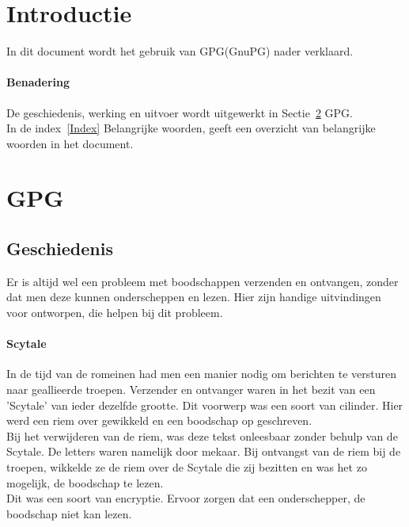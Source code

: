 \documentclass[12pt]{article}
\begin{document}
	\maketitle

	\newpage
	\tableofcontents
	\newpage
	\listoffigures
	\listoftables

	\newpage
		\section{Introductie}
			In dit document wordt het gebruik van GPG(GnuPG) nader verklaard.

		\paragraph{Benadering}
			De geschiedenis, werking en uitvoer wordt uitgewerkt in Sectie~\ref{GPG} GPG.\\
			In de index~\ref{Index} Belangrijke woorden, geeft een overzicht van 									belangrijke woorden in het document.

		\newpage
		\section{GPG}\label{GPG}
			\subsection{Geschiedenis}
				Er is altijd wel een probleem met boodschappen verzenden en ontvangen, zonder dat men 				deze kunnen onderscheppen en lezen. Hier zijn handige uitvindingen voor ontworpen, 						die helpen bij dit probleem.

			\paragraph{Scytale}
				In de tijd van de romeinen had men een manier nodig om berichten te versturen naar 						geallieerde troepen. Verzender en ontvanger waren in het bezit van een 									'Scytale' van ieder dezelfde grootte. Dit voorwerp was een soort van 					cilinder. Hier werd een riem over gewikkeld en een boodschap op geschreven.\\
				Bij het verwijderen van de riem, was deze tekst onleesbaar zonder behulp van de 						Scytale. De letters waren namelijk door mekaar. Bij ontvangst van de riem bij de 						troepen, wikkelde ze de riem over de Scytale die zij bezitten en was het zo mogelijk, 				de boodschap te lezen.\\
				Dit was een soort van encryptie. Ervoor zorgen dat een onderschepper, de boodschap 						niet kan lezen.
\end{document}
